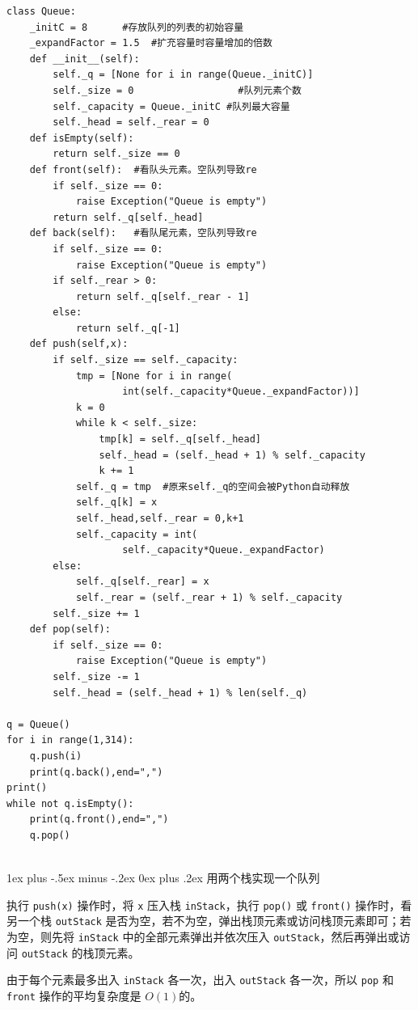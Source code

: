 \documentclass[10pt,UTF8,a4paper]{ctexart}
\makeatletter
\renewcommand{\subsubsection}{\@startsection{subsubsection}{3}{0mm}%
                                {1ex plus -.5ex minus -.2ex}%
                                {0ex plus .2ex}%
                                {\normalfont\small\bfseries}}
\makeatother
\begin{document}
\begin{multicols}{3}
\begin{lstlisting}[style=python]
class Queue:
	_initC = 8		#存放队列的列表的初始容量
	_expandFactor = 1.5  #扩充容量时容量增加的倍数
	def __init__(self):
		self._q = [None for i in range(Queue._initC)]
		self._size = 0				    #队列元素个数
		self._capacity = Queue._initC #队列最大容量
		self._head = self._rear = 0
	def isEmpty(self):
		return self._size == 0
	def front(self):  #看队头元素。空队列导致re
		if self._size == 0:
			raise Exception("Queue is empty")
		return self._q[self._head]
	def back(self):   #看队尾元素，空队列导致re
		if self._size == 0:
			raise Exception("Queue is empty")
		if self._rear > 0:
			return self._q[self._rear - 1]
		else:
			return self._q[-1]
	def push(self,x):
		if self._size == self._capacity:
			tmp = [None for i in range(
					int(self._capacity*Queue._expandFactor))]
			k = 0
			while k < self._size:
				tmp[k] = self._q[self._head]
				self._head = (self._head + 1) % self._capacity
				k += 1
			self._q = tmp  #原来self._q的空间会被Python自动释放
			self._q[k] = x
			self._head,self._rear = 0,k+1
			self._capacity = int(
					self._capacity*Queue._expandFactor)
		else:
			self._q[self._rear] = x
			self._rear = (self._rear + 1) % self._capacity
		self._size += 1
	def pop(self):
		if self._size == 0:
			raise Exception("Queue is empty")
		self._size -= 1
		self._head = (self._head + 1) % len(self._q)

q = Queue()
for i in range(1,314):
	q.push(i)
	print(q.back(),end=",")
print()
while not q.isEmpty():
	print(q.front(),end=",")
	q.pop()


\end{lstlisting}

\subsubsection{用两个栈实现一个队列}


执行 \verb|push(x)| 操作时，将 \verb|x| 压入栈 \verb|inStack|，执行 \verb|pop()| 或 \verb|front()| 操作时，看另一个栈 \verb|outStack| 是否为空，若不为空，弹出栈顶元素或访问栈顶元素即可；若为空，则先将 \verb|inStack| 中的全部元素弹出并依次压入 \verb|outStack|，然后再弹出或访问 \verb|outStack| 的栈顶元素。



由于每个元素最多出入 \verb|inStack| 各一次，出入 \verb|outStack| 各一次，所以 \verb|pop| 和 \verb|front| 操作的平均复杂度是 $O(1)$的。


























\end{multicols}
\end{document}
